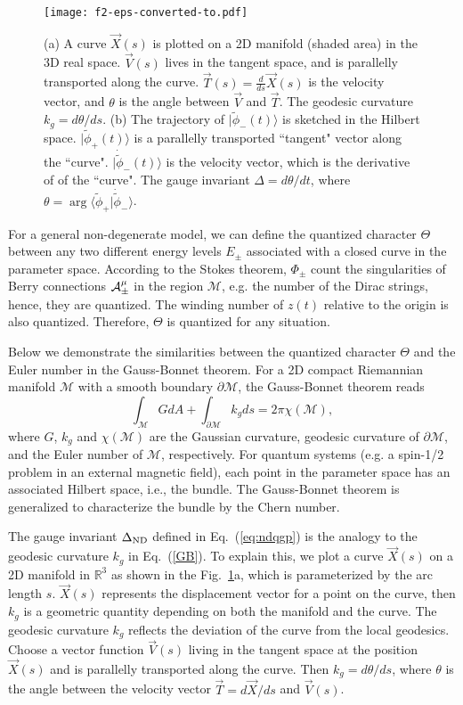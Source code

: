 \documentclass[aps,pra,twocolumn,groupedaddress,10pt]{revtex4}
\begin{document}
\begin{figure}
\texttt{[image: f2-eps-converted-to.pdf]}
\caption{(a) A curve $\vec{X} (s)$ is plotted on a 2D manifold (shaded area) in the
3D real space.
$\vec{V}(s)$ lives in the tangent space, and is parallelly transported
along the curve.
$\vec{T}(s) = \frac{d}{ds}\vec{X}(s)$ is the velocity vector, and
$\theta$ is the angle between $\vec{V}$ and $\vec{T}$.
The geodesic curvature $k_g=d\theta/ds$.
(b) The trajectory of $|\tilde{\phi}_-(t)\rangle$ is sketched
in the Hilbert space.
$|\tilde{\phi}_+(t)\rangle$	is a parallelly transported ``tangent"
vector along the ``curve".
$|\dot{\tilde{\phi}}_-(t)\rangle$ is the velocity vector, which is the derivative of of the ``curve".
The gauge invariant $\Delta=d\theta/dt$, where $\theta = \arg\langle \tilde{\phi}_+|\dot{\tilde{\phi}}_-\rangle$.}
\label{f2}
\end{figure}

For a general non-degenerate model, we can define the quantized
character $\Theta$ between any two different energy levels
$E_\pm$ associated with a closed curve in the parameter space.
According to the Stokes theorem, $\Phi_\pm$ count the singularities
of Berry connections $\cal A_\pm^\mu$ in the region $\mathcal{M}$,
e.g. the number of the Dirac strings, hence, they are quantized.
The winding number of $z(t)$ relative to the origin is also quantized.
Therefore, $\Theta$ is quantized for any situation.

Below we demonstrate the similarities between the quantized
character $\Theta$ and the Euler number in the Gauss-Bonnet theorem.
For a 2D compact Riemannian manifold $\mathcal{M}$ with a smooth
boundary $\partial \mathcal{M}$, the Gauss-Bonnet theorem reads
\begin{equation}\label{GB}
\int_{\mathcal{M}} G dA + \int_{\partial \mathcal{M}} k_g ds = 2\pi \chi(\mathcal{M}),
\end{equation}
where $G$, $k_g$ and $\chi(\mathcal{M})$ are the Gaussian curvature,
geodesic curvature of $\partial \mathcal{M}$, and the Euler number
of $\mathcal{M}$, respectively.
For quantum systems (e.g. a spin-1/2 problem in an external magnetic
field), each point in the parameter space has an associated Hilbert
space, i.e., the bundle.
The Gauss-Bonnet theorem is generalized to characterize the bundle
by the Chern number.

The gauge invariant $\Delta_{\rm{ND}}$ defined in Eq.~(\ref{eq:ndqgp}) is the analogy
to the geodesic curvature $k_g$ in Eq.~(\ref{GB}).
To explain this, we plot a curve $\vec{X}(s)$ on a 2D manifold in $\mathbb{R}^3$ as shown in the Fig.~\ref{f2}a, which is parameterized by the arc length $s$.
$\vec{X}(s)$ represents the displacement vector for a point on the curve, then $k_g$ is a geometric quantity depending on both the manifold and the curve.
The geodesic curvature $k_g$ reflects the deviation of the curve from
the local geodesics.
Choose a vector function $\vec V(s)$ living in the tangent space at the position $\vec X(s)$ and is parallelly transported along the curve.
Then $k_g = d\theta/ds$, where $\theta$ is the angle between the velocity vector $\vec{T}=d\vec{X}/ds$ and $\vec V(s)$.
\end{document}

